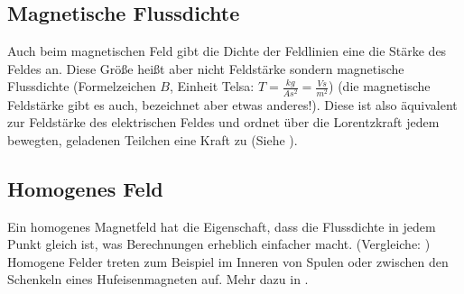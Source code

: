 \subsection{Magnetische Flussdichte}

Auch beim magnetischen Feld gibt die Dichte der Feldlinien eine die Stärke des Feldes an. Diese Größe heißt aber nicht Feldstärke sondern \glqq magnetische Flussdichte \grqq{} (Formelzeichen $B$, Einheit \glqq Telsa\grqq : $T=\frac{kg}{As^2}=\frac{Vs}{m^2}$) (die magnetische Feldstärke gibt es auch, bezeichnet aber etwas anderes!). Diese ist also äquivalent zur Feldstärke des elektrischen Feldes und ordnet über die Lorentzkraft jedem bewegten, geladenen Teilchen eine Kraft zu (Siehe ).


\subsection{Homogenes Feld} \label{subsec:MFeldHomogen}

Ein homogenes Magnetfeld hat die Eigenschaft, dass die Flussdichte in jedem Punkt gleich ist, was Berechnungen erheblich einfacher macht. (Vergleiche: ) Homogene Felder treten zum Beispiel im Inneren von Spulen oder zwischen den Schenkeln eines Hufeisenmagneten auf. Mehr dazu in .

















